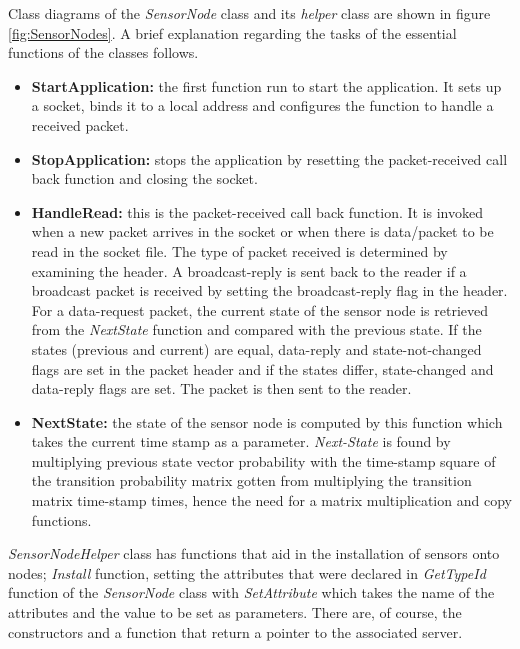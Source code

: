 Class diagrams of the \textit{SensorNode} class and its \textit{helper} class are
shown in figure \ref{fig:SensorNodes}. A brief explanation regarding the tasks of
the essential functions of the classes follows.
\begin{itemize}
\renewcommand{\labelitemi}{}
\item \textbf{StartApplication:} the first function run to start the application.
    It sets up a socket, binds it to a local address and configures the function
    to handle a received packet.
\item \textbf{StopApplication:} stops the application by resetting the
    packet-received call back function and closing the socket.
\item \textbf{HandleRead:} this is the packet-received call back function. It is
    invoked when a new packet arrives in the socket or when there is data/packet
    to be read in the socket file. The type of packet received is determined by
    examining the header. A broadcast-reply is sent back to the reader if a broadcast
    packet is received by setting the broadcast-reply flag in the header. For a
    data-request packet, the current state of the sensor node is retrieved from the
    \textit{NextState} function and compared with the previous state. If the states
    (previous and current) are equal, data-reply and state-not-changed flags are set
    in the packet header and if the states differ, state-changed and data-reply
    flags are set. The packet is then sent to the reader.
\item \textbf{NextState:} the state of the sensor node is computed by this function
    which takes the current time stamp as a parameter. \textit{Next-State} is found
    by multiplying previous state vector probability with the time-stamp square of
    the transition probability matrix gotten from multiplying the transition matrix
    time-stamp times, hence the need for a matrix multiplication and copy functions.
\end{itemize}
\textit{SensorNodeHelper} class has functions that aid in the installation of sensors
onto nodes; \textit{Install} function, setting the attributes that were declared in
\textit{GetTypeId} function of the \textit{SensorNode} class with \textit{SetAttribute}
which takes the name of the attributes and the value to be set as parameters. There
are, of course, the constructors and a function that return a pointer to the
associated server.

